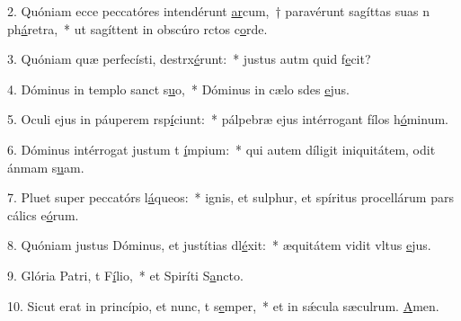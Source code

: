 2. Quóniam ecce peccatóres intendérunt \uline{ar}cum,~† paravérunt sagíttas suas n ph\uline{á}retra,~* ut sagíttent in obscúro rctos c\uline{o}rde.\par 
3. Quóniam quæ perfecísti, destrx\uline{é}runt:~* justus autm quid f\uline{e}cit?\par 
4. Dóminus in templo sanct s\uline{u}o,~* Dóminus in cælo sdes \uline{e}jus.\par 
5. Oculi ejus in páuperem rsp\uline{í}ciunt:~* pálpebræ ejus intérrogant fílos h\uline{ó}minum.\par 
6. Dóminus intérrogat justum t \uline{í}mpium:~* qui autem díligit iniquitátem, odit ánmam s\uline{u}am.\par 
7. Pluet super peccatórs l\uline{á}queos:~* ignis, et sulphur, et spíritus procellárum pars cálics e\uline{ó}rum.\par 
8. Quóniam justus Dóminus, et justítias dl\uline{é}xit:~* æquitátem vidit vltus \uline{e}jus.\par 
9. Glória Patri, t F\uline{í}lio,~* et Spiríti S\uline{a}ncto.\par 
10. Sicut erat in princípio, et nunc, t s\uline{e}mper,~* et in sǽcula sæculrum. \uline{A}men.\par 
